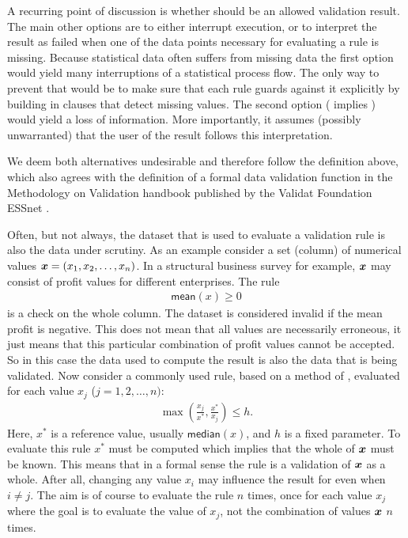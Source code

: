 A recurring point of discussion is whether \na{} should be an allowed
validation result. The main other options are to either interrupt execution, or
to interpret the result as failed when one of the data points necessary for
evaluating a rule is missing. Because statistical data often suffers from
missing data the first option would yield many interruptions of a statistical
process flow. The only way to prevent that would be to make sure that each rule
guards against it explicitly by building in clauses that detect missing values.
The second option (\na{} implies \onwaar{}) would yield a loss of information.
More importantly, it assumes (possibly unwarranted) that the user of the result
follows this interpretation.

We deem both alternatives undesirable and therefore follow the definition
above, which also agrees with the definition of a formal data validation
function in the Methodology on Validation handbook published by the Validat
Foundation ESSnet \citep{zio2015methodology}.

Often, but not always, the dataset that is used to evaluate a validation rule
is also the data under scrutiny. As an example consider a set (column) of
numerical values $\boldsymbol{x}=(x_1,x_2,\ldots,x_n)$. In a structural business survey
for example, $\boldsymbol{x}$ may consist of profit values for different enterprises.
The rule 
\begin{align*}
\textsf{mean}(x) \geq 0
\end{align*}
is a check on the whole column. The dataset is considered invalid if the mean
profit is negative. This does not mean that all values are necessarily
erroneous, it just means that this particular combination of profit values
cannot be accepted. So in this case the data used to compute the result is also
the data that is being validated. Now consider a commonly used rule, based on a
method of \citet{hiridoglou1986statistical}, evaluated for each value $x_j$
($j=1,2,\ldots, n)$:
\begin{align}
\max\left(\frac{x_j}{x^*},\frac{x^*}{x_j}\right) \leq h.
\label{eq:hbfun}
\end{align}
Here, $x^*$ is a reference value, usually $\textsf{median}(x)$, and $h$ is a
fixed parameter. To evaluate this rule $x^*$ must be computed which implies
that the whole of $\boldsymbol{x}$ must be known. This means that in a formal sense the
rule is a validation of $\boldsymbol{x}$ as a whole. After all, changing any value
$x_{i}$ may influence the result for even when $i\not=j$. The aim is of course
to evaluate the rule $n$ times, once for each value $x_j$ where the goal is to
evaluate the value of $x_j$, not the combination of values $\boldsymbol{x}$ $n$ times.

